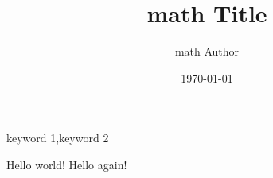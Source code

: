 \documentclass[tcn = 123456,sheet = true,titleinsheet = true,keywordsinsheet = true, titlepage = false]{mcmthesis}
\title{math Title}
\author{math Author}
\date{\today}
\begin{document}
	\let\saved\thepage  %
	\let\thepage\relax	%
		
	\begin{abstract}
		\lipsum[1]
	\end{abstract}
	\begin{keywords}
		keyword 1,keyword 2
	\end{keywords}
	\maketitle

	\newpage
	\let\thepage\saved %
	\setcounter{page}{1}	%
	Hello world!
	\newpage
	Hello again!
\end{document}
